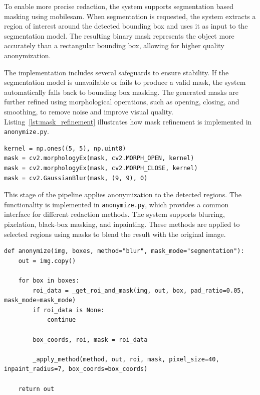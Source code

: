 
To enable more precise redaction, the system supports \gls{segmentation} based \gls{masking} using \gls{mobilesam}. When \gls{segmentation} is requested, the system extracts a region of interest around the detected \gls{bounding box} and uses it as input to the \gls{segmentation} model. The resulting binary mask represents the object more accurately than a rectangular \gls{bounding box}, allowing for higher quality \gls{anonymization}.

The implementation includes several safeguards to ensure stability. If the \gls{segmentation} model is unavailable or fails to produce a valid mask, the system automatically falls back to \gls{bounding box} \gls{masking}. The generated masks are further refined using morphological operations, such as opening, closing, and smoothing, to remove noise and improve visual quality. Listing~\ref{lst:mask_refinement} illustrates how mask refinement is implemented in \texttt{anonymize.py}.

\begin{lstlisting}[caption={Mask refinement using morphological operations}, label={lst:mask_refinement}]
kernel = np.ones((5, 5), np.uint8)
mask = cv2.morphologyEx(mask, cv2.MORPH_OPEN, kernel)
mask = cv2.morphologyEx(mask, cv2.MORPH_CLOSE, kernel)
mask = cv2.GaussianBlur(mask, (9, 9), 0)
\end{lstlisting}


This stage of the pipeline applies \gls{anonymization} to the detected regions. The functionality is implemented in \texttt{anonymize.py}, which provides a common interface for different redaction methods. The system supports blurring, pixelation, black-box \gls{masking}, and \gls{inpainting}. These methods are applied to selected regions using masks to blend the result with the original image.

\begin{lstlisting}[caption={Applying redaction to detected regions}, label={lst:anonymize_call}]
def anonymize(img, boxes, method="blur", mask_mode="segmentation"):
    out = img.copy()

    for box in boxes:
        roi_data = _get_roi_and_mask(img, out, box, pad_ratio=0.05, mask_mode=mask_mode)
        if roi_data is None:
            continue

        box_coords, roi, mask = roi_data

        _apply_method(method, out, roi, mask, pixel_size=40, inpaint_radius=7, box_coords=box_coords)

    return out
\end{lstlisting}

